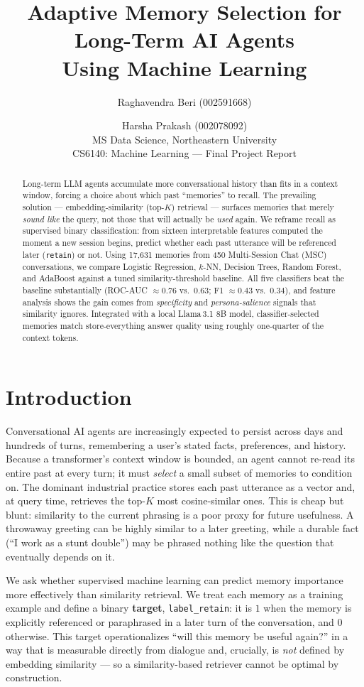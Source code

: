 \documentclass[11pt]{article}
\title{\textbf{Adaptive Memory Selection for Long-Term AI Agents\\Using Machine Learning}}
\author{Raghavendra Beri (002591668) \and Harsha Prakash (002078092)\\
\small MS Data Science, Northeastern University \\ \small CS6140: Machine Learning --- Final Project Report}
\date{}
\begin{document}
\maketitle

\begin{abstract}
\noindent Long-term LLM agents accumulate more conversational history than fits in a context
window, forcing a choice about which past ``memories'' to recall. The prevailing
solution --- embedding-similarity (top-$K$) retrieval --- surfaces memories that
merely \emph{sound like} the query, not those that will actually be \emph{used}
again. We reframe recall as supervised binary classification: from sixteen
interpretable features computed the moment a new session begins, predict whether
each past utterance will be referenced later (\texttt{retain}) or not. Using
17{,}631 memories from 450 Multi-Session Chat (MSC) conversations, we compare
Logistic Regression, $k$-NN, Decision Trees, Random Forest, and AdaBoost against a
tuned similarity-threshold baseline. All five classifiers beat the baseline
substantially (ROC-AUC $\approx 0.76$ vs.\ $0.63$; F1 $\approx 0.43$ vs.\ $0.34$),
and feature analysis shows the gain comes from \emph{specificity} and
\emph{persona-salience} signals that similarity ignores. Integrated with a local
Llama\,3.1 8B model, classifier-selected memories match store-everything answer
quality using roughly one-quarter of the context tokens.
\end{abstract}

\section{Introduction}
Conversational AI agents are increasingly expected to persist across days and
hundreds of turns, remembering a user's stated facts, preferences, and history.
Because a transformer's context window is bounded, an agent cannot re-read its
entire past at every turn; it must \emph{select} a small subset of memories to
condition on. The dominant industrial practice stores each past utterance as a
vector and, at query time, retrieves the top-$K$ most cosine-similar ones. This
is cheap but blunt: similarity to the current phrasing is a poor proxy for future
usefulness. A throwaway greeting can be highly similar to a later greeting, while
a durable fact (``I work as a stunt double'') may be phrased nothing like the
question that eventually depends on it.

We ask whether supervised machine learning can predict memory importance more
effectively than similarity retrieval. We treat each memory as a training example
and define a binary \textbf{target}, \texttt{label\_retain}: it is $1$ when the
memory is explicitly referenced or paraphrased in a later turn of the
conversation, and $0$ otherwise. This target operationalizes ``will this memory be
useful again?'' in a way that is measurable directly from dialogue and, crucially,
is \emph{not} defined by embedding similarity --- so a similarity-based retriever
cannot be optimal by construction.
\end{document}
